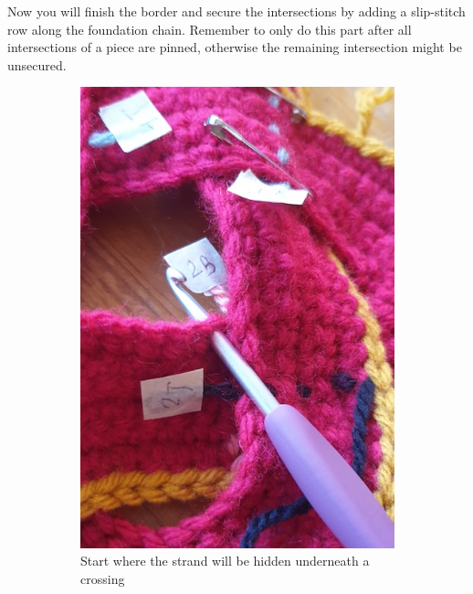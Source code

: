 \documentclass[openany]{book}
\begin{document}
Now you will finish the border and secure the intersections by adding a slip-stitch row along the foundation chain. Remember to only do this part after all intersections of a piece are pinned, otherwise the remaining intersection might be unsecured.


\begin{figure}[H]\centering
\begin{subfigure}[t]{.45\textwidth}\centering
\includegraphics[width=.95\textwidth]{bk/top1}
\caption{Start where the strand will be hidden underneath a crossing}
\end{subfigure}
%
\begin{subfigure}[t]{.45\textwidth}
		\centering

\end{subfigure}
\end{figure}
\end{document}
